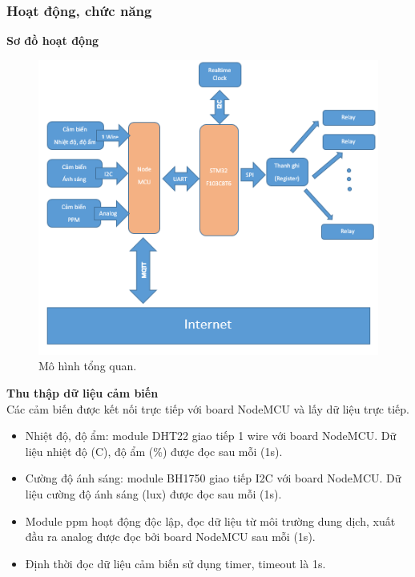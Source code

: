 \documentclass[a4paper,12pt,oneside]{article}
\begin{document}
\subsubsection{Hoạt động, chức năng}
\textbf{Sơ đồ hoạt động}\\
\begin{center}
\begin{figure}[h!]
\begin{center}
\includegraphics[scale=1]{hinh/mohinh.png}
\end{center}
\caption{Mô hình tổng quan.}
\end{figure}
\end{center}

\textbf{Thu thập dữ liệu cảm biến}\\
\noindent Các cảm biến được kết nối trực tiếp với board NodeMCU và lấy dữ liệu trực tiếp.
\begin{itemize}
	\item Nhiệt độ, độ ẩm: module DHT22 giao tiếp 1 wire với board NodeMCU. Dữ liệu nhiệt độ (C), độ ẩm (\%) được đọc sau mỗi (1s).
	\item Cường độ ánh sáng: module BH1750 giao tiếp I2C với board NodeMCU. Dữ liệu cường độ ánh sáng (lux) được đọc sau mỗi (1s).
	\item Module ppm hoạt động độc lập, đọc dữ liệu từ môi trường dung dịch, xuất đầu ra analog được đọc bởi board NodeMCU sau mỗi (1s).
	\item Định thời đọc dữ liệu cảm biến sử dụng timer, timeout là 1s.
\end{itemize}
\end{document}
